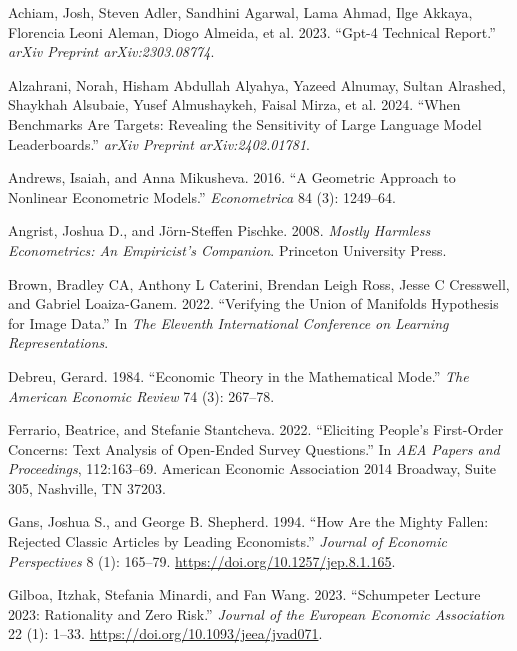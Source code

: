 \documentclass[
]{article}
\newlength{\cslhangindent}
\newenvironment{CSLReferences}[2] %
 {\begin{list}{}{%
  \setlength{\itemindent}{0pt}
  \setlength{\leftmargin}{0pt}
  \setlength{\parsep}{0pt}
  \ifodd #1
   \setlength{\leftmargin}{\cslhangindent}
   \setlength{\itemindent}{-1\cslhangindent}
  \fi
  \setlength{\itemsep}{#2\baselineskip}}}
 {\end{list}}
\begin{document}
\label{refs}
\begin{CSLReferences}{1}{0}
Achiam, Josh, Steven Adler, Sandhini Agarwal, Lama Ahmad, Ilge Akkaya,
Florencia Leoni Aleman, Diogo Almeida, et al. 2023. {``Gpt-4 Technical
Report.''} \emph{arXiv Preprint arXiv:2303.08774}.

Alzahrani, Norah, Hisham Abdullah Alyahya, Yazeed Alnumay, Sultan
Alrashed, Shaykhah Alsubaie, Yusef Almushaykeh, Faisal Mirza, et al.
2024. {``When Benchmarks Are Targets: Revealing the Sensitivity of Large
Language Model Leaderboards.''} \emph{arXiv Preprint arXiv:2402.01781}.

Andrews, Isaiah, and Anna Mikusheva. 2016. {``A Geometric Approach to
Nonlinear Econometric Models.''} \emph{Econometrica} 84 (3): 1249--64.

Angrist, Joshua D., and Jörn-Steffen Pischke. 2008. \emph{Mostly
Harmless Econometrics: An Empiricist's Companion}. Princeton University
Press.

Brown, Bradley CA, Anthony L Caterini, Brendan Leigh Ross, Jesse C
Cresswell, and Gabriel Loaiza-Ganem. 2022. {``Verifying the Union of
Manifolds Hypothesis for Image Data.''} In \emph{The Eleventh
International Conference on Learning Representations}.

Debreu, Gerard. 1984. {``Economic Theory in the Mathematical Mode.''}
\emph{The American Economic Review} 74 (3): 267--78.

Ferrario, Beatrice, and Stefanie Stantcheva. 2022. {``Eliciting People's
First-Order Concerns: Text Analysis of Open-Ended Survey Questions.''}
In \emph{AEA Papers and Proceedings}, 112:163--69. American Economic
Association 2014 Broadway, Suite 305, Nashville, TN 37203.

Gans, Joshua S., and George B. Shepherd. 1994. {``How Are the Mighty
Fallen: Rejected Classic Articles by Leading Economists.''}
\emph{Journal of Economic Perspectives} 8 (1): 165--79.
\url{https://doi.org/10.1257/jep.8.1.165}.

Gilboa, Itzhak, Stefania Minardi, and Fan Wang. 2023. {``{Schumpeter
Lecture 2023: Rationality and Zero Risk}.''} \emph{Journal of the
European Economic Association} 22 (1): 1--33.
\url{https://doi.org/10.1093/jeea/jvad071}.


\end{CSLReferences}
\end{document}
